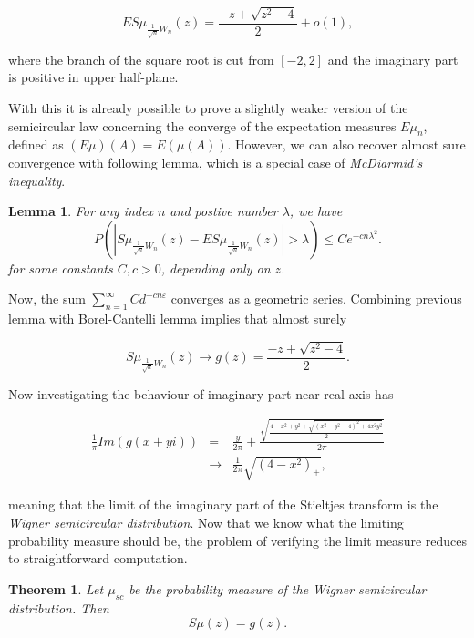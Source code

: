 \documentclass[12pt,a4paper,leqno]{report}
\theoremstyle{plain}
\newtheorem{theo}[equation]{Theorem}
\newtheorem{lem}[equation]{Lemma}
\theoremstyle{definition}
\theoremstyle{remark}
\begin{document}
\begin{equation*}
ES\mu_{\frac{1}{\sqrt{n}}W_n}(z) = \frac{-z + \sqrt{z^2 - 4}}{2} +o(1),
\end{equation*}

where the branch of the square root is cut from $[-2,2]$ and the imaginary part is positive in upper half-plane.

With this it is already possible to prove a slightly weaker version of the semicircular law concerning the converge of the expectation measures $E\mu_n$, defined as $(E\mu)(A) = E(\mu(A))$. However, we can also recover almost sure convergence with following lemma, which is a special case of \emph{McDiarmid's inequality}.

\begin{lem}
For any index $n$ and postive number $\lambda$, we have
\begin{equation*}
P(|S\mu_{\frac{1}{\sqrt{n}}W_n}(z)- ES\mu_{\frac{1}{\sqrt{n}}W_n}(z)|>\lambda) \leq Ce^{-cn\lambda^2}.
\end{equation*}
for some constants $C, c > 0$, depending only on $z$.
\end{lem}

Now, the sum $\sum_{n=1}^{\infty} Cd^{-cn\varepsilon}$ converges as a geometric series. Combining previous lemma with Borel-Cantelli lemma implies that almost surely

\begin{equation*}
S\mu_{\frac{1}{\sqrt{n}}W_n}(z) \to g(z) = \frac{-z + \sqrt{z^2-4}}{2}.
\end{equation*}

Now investigating the behaviour of imaginary part near real axis has

\begin{eqnarray*}
\frac{1}{\pi} Im(g(x+yi)) & = &
\frac{y}{2\pi} + \frac{\sqrt{\frac{4-x^2+y^2+\sqrt{(x^2-y^2-4)^2+4x^2y^2}}{2}}}{2\pi}\\
& \to & \frac{1}{2\pi} \sqrt{(4-x^2)_+},
\end{eqnarray*}

meaning that the limit of the imaginary part of the Stieltjes transform is the \emph{Wigner semicircular distribution}. Now that we know what the limiting probability measure should be, the problem of verifying the limit measure reduces to straightforward computation.

\begin{theo}
Let $\mu_{sc}$ be the probability measure of the Wigner semicircular distribution. Then
\begin{equation*}
S\mu(z) = g(z).
\end{equation*}
\end{theo}
\end{document}

